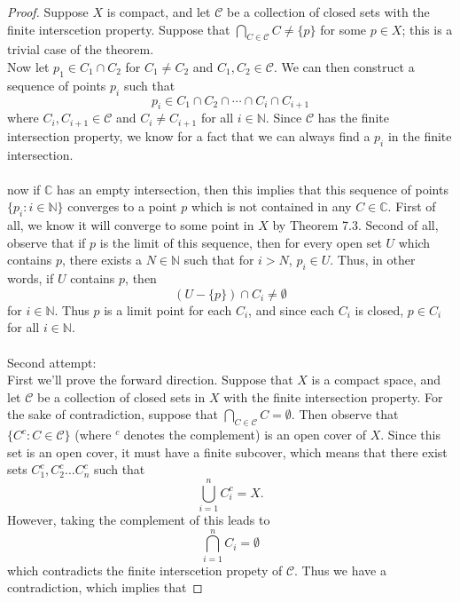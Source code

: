 \documentclass[a4paper,12pt,twoside]{hmcpset}
\begin{document}
\begin{proof}
    Suppose $X$ is compact, and let $\mathcal{C}$ be a collection of
    closed sets with the finite interscetion property. Suppose that
    $\bigcap_{C \in \mathcal{C}} C \ne \{p\}$ for some $p \in X$; this
    is a trivial case of the theorem. \\
    Now let $p_1 \in C_1 \cap C_2$ for $C_1 \ne C_2$ and $C_1, C_2 \in
    \mathcal{C}$. We can then construct a sequence of points $p_i$
    such that 
    $$
    p_i \in C_1 \cap C_2 \cap \cdots \cap C_i \cap C_{i + 1}
    $$ 
    where $C_i, C_{i + 1} \in \mathcal{C}$ and $C_i \ne C_{i + 1}$ for
    all $i \in \mathbb{N}.$ Since $\mathcal{C}$ has the finite
    intersection property, we know for a fact that we can always find
    a $p_i$ in the finite intersection. \\
    \\
    now if $\mathbb{C}$ has an empty intersection, then this implies
    that this sequence of points $\{p_i : i \in \mathbb{N}\}$
    converges to a point $p$ which is not contained in any $C \in
    \mathbb{C}$. First of all, we know it will converge to some point
    in $X$ by Theorem 7.3. Second of all, observe that if $p$ is the
    limit of this sequence, then for every open set $U$ which contains
    $p$, there exists a $N \in \mathbb{N}$ such that for $i > N$, $p_i
    \in U$. Thus, in other words, if $U$ contains $p$, then 
    $$
    (U - \{p\})\cap C_i \ne \emptyset
    $$
    for $i \in \mathbb{N}$. Thus $p$ is a limit point for each $C_i$,
    and since each $C_i$ is closed, $p \in C_i$ for all $i \in
    \mathbb{N}$. \\
    \\
    Second attempt: \\
    First we'll prove the forward direction. Suppose that $X$ is a
    compact space, and let $\mathcal{C}$ be a collection of closed
    sets in $X$ with the finite intersection property. For the sake of
    contradiction, suppose that $\bigcap_{C \in \mathcal{C}} C =
    \emptyset.$ Then observe that $\{C^c : C \in \mathcal{C}\}$ (where
    $^c$ denotes the complement) is an open cover of $X$. Since this
    set is an open cover, it must have a finite subcover, which means
    that there exist sets $C_1^c, C_2^c \dots C_n^c$ such that 
    $$
    \bigcup_{i = 1}^n C_i^c = X.
    $$  
    However, taking the complement of this leads to 
    $$
    \bigcap_{i = 1}^n C_i = \emptyset
    $$ 
    which contradicts the finite interscetion propety of
    $\mathcal{C}$. Thus we have a contradiction, which implies that

\end{proof}
\end{document}

